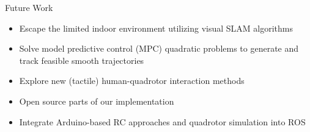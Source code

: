 \documentclass[final,hyperref={pdfpagelabels=false}]{beamer}
\newcommand{\blocktextwidth}{0.93\textwidth}
\begin{document}
\begin{frame}[t]
\begin{columns}[t]
\begin{column}{0.6375\textwidth}
\begin{columns}[T]
\begin{column}{0.486\textwidth}
\begin{block}{Future Work}
\begin{minipage}[]{\blocktextwidth}
\begin{itemize}[leftmargin=*,labelindent=0pt,label={\color{black!40}$\bullet$}]
\item{Escape the limited indoor environment utilizing visual SLAM algorithms}
\item{Solve model predictive control (MPC) quadratic problems to generate and track feasible smooth trajectories}
\item{Explore new (tactile) human-quadrotor interaction methods}
\item{Open source parts of our implementation}
\item{Integrate Arduino-based RC approaches and quadrotor simulation into ROS}
\end{itemize}
\end{minipage}
\end{block}


\end{column}
\end{columns}


\end{column} %
\end{columns} %



\end{frame}
\end{document}
